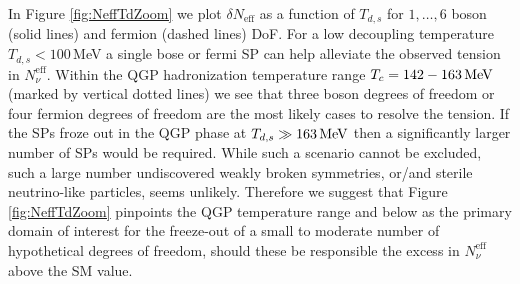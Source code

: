 In Figure \ref{fig:NeffTdZoom} we plot $\delta N_{\text{eff}}$ as a function of $T_{d,s}$ for $1,\dots,6$ boson (solid lines) and fermion (dashed lines) DoF. For a low decoupling temperature $T_{d,s}<100$\,MeV a single bose or fermi SP can help alleviate the observed tension in $N^{\text{eff}}_{\nu}$. Within the QGP hadronization temperature range $T_c=142-163\text{\,MeV}$ (marked by vertical dotted lines) we see that three boson degrees of freedom or four fermion degrees of freedom are the most likely cases to resolve the tension. If the SPs froze out in the QGP phase at $T_{d,s}\gg 163\text{\,MeV}$ then a significantly larger number of SPs would be required. While such a scenario cannot be excluded, such a large number undiscovered weakly broken symmetries, or/and sterile neutrino-like particles, seems unlikely. Therefore we suggest that Figure \ref{fig:NeffTdZoom} pinpoints the QGP temperature range and below as the primary domain of interest for the freeze-out of a small to moderate number of hypothetical degrees of freedom, should these be responsible the excess in $N_\nu^{\text{eff}}$ above the SM value.
